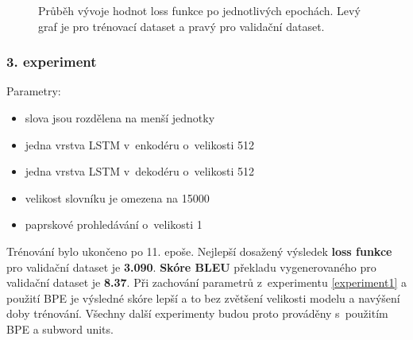 \begin{figure}[H]
    \begin{center}
    \end{center}
	\caption{Průběh vývoje hodnot loss funkce po jednotlivých epochách. Levý graf je pro trénovací dataset a pravý pro validační dataset.}
\end{figure}


\subsubsection{3. experiment}\label{experiment3}
Parametry:
\begin{itemize}
  \item slova jsou rozdělena na menší jednotky
  \item jedna vrstva LSTM v~enkodéru o~velikosti 512
  \item jedna vrstva LSTM v~dekodéru o~velikosti 512
  \item velikost slovníku je omezena na 15000
  \item paprskové prohledávání o~velikosti 1
\end{itemize}

Trénování bylo ukončeno po 11. epoše. Nejlepší dosažený výsledek \textbf{loss funkce} pro validační dataset je \textbf{3.090}. \textbf{Skóre BLEU} překladu vygenerovaného pro validační dataset je \textbf{8.37}. Při zachování parametrů z~experimentu \ref{experiment1} a použití BPE je výsledné skóre lepší a to bez zvětšení velikosti modelu a navýšení doby trénování. Všechny další experimenty budou proto prováděny s~použitím BPE a subword units.

